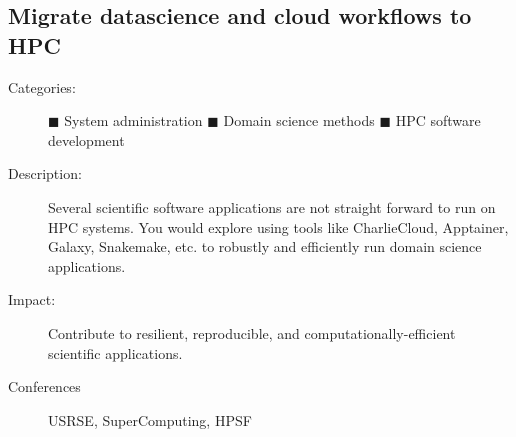 \documentclass[12pt]{article}
\begin{document}
\subsection{Migrate datascience and cloud workflows to HPC}
\begin{description}
\item[Categories:]
  \textcolor{black!60}{$\blacksquare$} System administration
  \textcolor{green!50!black}{$\blacksquare$} Domain science methods
  \textcolor{blue!80!black}{$\blacksquare$} HPC software development
\item[Description:] Several scientific software applications %
  are not straight forward to run on HPC systems.
  You would explore using tools like %
  CharlieCloud, %
  Apptainer, %
  Galaxy, %
  Snakemake, etc. %
  to robustly and efficiently run domain science applications.
\item[Impact:] Contribute to %
  resilient, reproducible, and computationally-efficient %
  scientific applications.
\item[Conferences] USRSE, SuperComputing, HPSF
\end{description}

\printbibliography[heading=none]{}%
\label{mylastpage}
\end{document}
